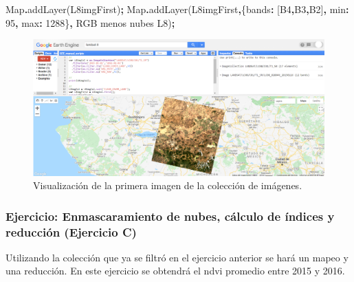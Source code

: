 \documentclass[
  12pt,
  letterpaper,
  twoside]{book}
\newenvironment{Shaded}{\begin{snugshade}}{\end{snugshade}}
\newcommand{\BuiltInTok}[1]{#1}
\newcommand{\DataTypeTok}[1]{\textcolor[rgb]{0.13,0.29,0.53}{#1}}
\newcommand{\DecValTok}[1]{\textcolor[rgb]{0.00,0.00,0.81}{#1}}
\newcommand{\FunctionTok}[1]{\textcolor[rgb]{0.00,0.00,0.00}{#1}}
\newcommand{\NormalTok}[1]{#1}
\newcommand{\OperatorTok}[1]{\textcolor[rgb]{0.81,0.36,0.00}{\textbf{#1}}}
\newcommand{\StringTok}[1]{\textcolor[rgb]{0.31,0.60,0.02}{#1}}
\begin{document}
\begin{Shaded}
\begin{Highlighting}[]
\BuiltInTok{Map}\OperatorTok{.}\FunctionTok{addLayer}\NormalTok{(L8imgFirst)}\OperatorTok{;}
\BuiltInTok{Map}\OperatorTok{.}\FunctionTok{addLayer}\NormalTok{(L8imgFirst}\OperatorTok{,}\NormalTok{\{}\DataTypeTok{bands}\OperatorTok{:}\NormalTok{ [}\StringTok{\textquotesingle{}B4\textquotesingle{}}\OperatorTok{,}\StringTok{\textquotesingle{}B3\textquotesingle{}}\OperatorTok{,}\StringTok{\textquotesingle{}B2\textquotesingle{}}\NormalTok{]}\OperatorTok{,} \DataTypeTok{min}\OperatorTok{:} \DecValTok{95}\OperatorTok{,} \DataTypeTok{max}\OperatorTok{:} \DecValTok{1288}\NormalTok{\}}\OperatorTok{,} 
  \StringTok{\textquotesingle{}RGB menos nubes L8\textquotesingle{}}\NormalTok{)}\OperatorTok{;}
\end{Highlighting}
\end{Shaded}

\begin{figure}

{\centering \includegraphics[width=1\linewidth]{Img/RGBIm} 

}

\caption{Visualización de la primera imagen de la colección de imágenes.}\label{fig:unnamed-chunk-147}
\end{figure}

\hypertarget{ejercicio-enmascaramiento-de-nubes-cuxe1lculo-de-uxedndices-y-reducciuxf3n-ejercicio-c}{%
\subsubsection{Ejercicio: Enmascaramiento de nubes, cálculo de índices y reducción (Ejercicio C)}\label{ejercicio-enmascaramiento-de-nubes-cuxe1lculo-de-uxedndices-y-reducciuxf3n-ejercicio-c}}

Utilizando la colección que ya se filtró en el ejercicio anterior se hará un mapeo y una reducción. En este ejercicio se obtendrá el ndvi promedio entre 2015 y 2016.
\end{document}
